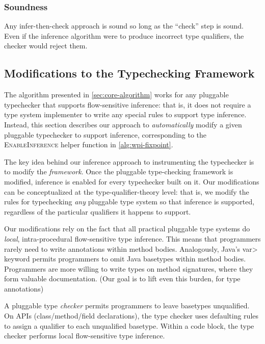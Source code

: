 \subsubsection{Soundness}
\label{sec:soundness}

Any infer-then-check approach is sound so long as the ``check'' step is sound.
Even if the inference algorithm were to produce incorrect type qualifiers,
the checker would reject them.


\subsection{Modifications to the Typechecking Framework}
\label{sec:instrument}

The algorithm presented in \cref{sec:core-algorithm} works for
any pluggable typechecker that supports flow-sensitive inference:
that is, it does not require a type system implementer to write
any special rules to support type inference. Instead, this section
describes our approach to \emph{automatically} modify a given
pluggable typechecker to support inference, corresponding to the
\textsc{Enable\-Inference} helper function in \cref{alg:wpi-fixpoint}.

The key idea behind our inference approach to instrumenting the typechecker
is to modify the \emph{framework}.  Once the pluggable type-checking
framework is modified, inference is enabled for every typechecker built on it.
Our modifications
can be conceptualized at the type-qualifier-theory level: that is,
we modify the rules for typechecking \emph{any} pluggable type system
so that inference is supported,
regardless of the particular qualifiers it happens to support.

Our modifications rely on the fact that all practical pluggable type systems
do \emph{local}, intra-procedural flow-sensitive type inference.
This means that programmers rarely need to write annotations within method bodies.
Analogously, Java's \<var> keyword permits programmers to omit Java basetypes within
method bodies.
Programmers are more willing to write types on method
signatures, where they form valuable documentation.  (Our goal is to lift
even this burden, for type annotations)


A pluggable type \emph{checker} permits programmers to leave basetypes unqualified.
On APIs (class/method/field declarations), the type checker uses defaulting
rules to assign a qualifier to each unqualified basetype.
Within a code block, the type checker performs local flow-sensitive type
inference.


